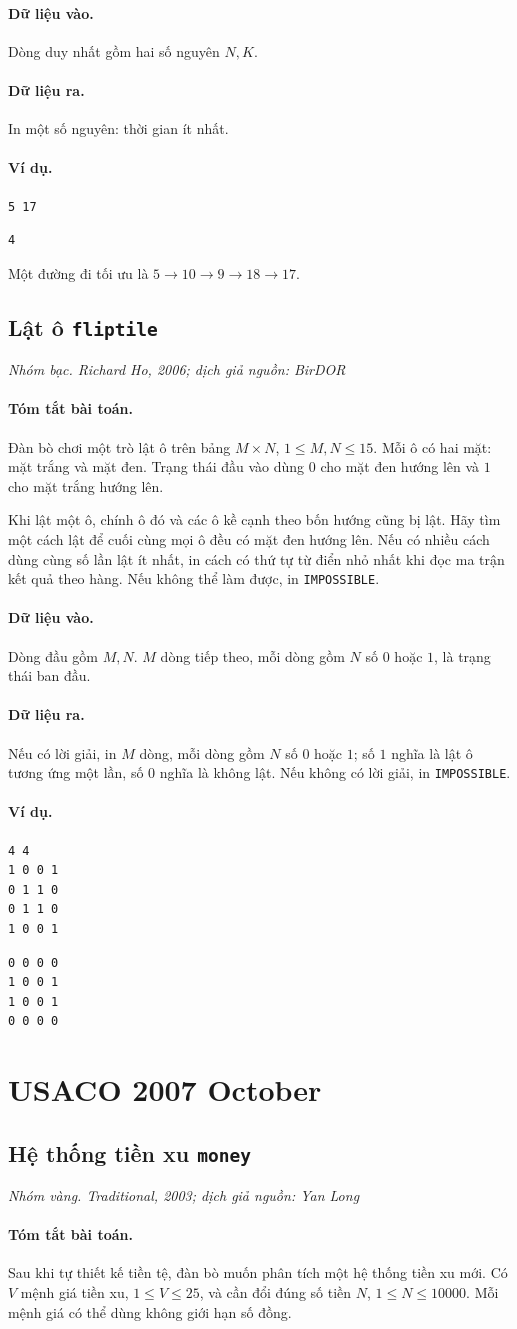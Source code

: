 \documentclass[11pt]{article}
\newcommand{\problem}[4]{%
  \subsection[#1 (#2)]{#1 \hfill {\normalsize\texttt{#2}}}%
  \noindent\textit{#3. #4}\par\smallskip
}
\newcommand{\iosec}[1]{\paragraph{#1}}
\begin{document}
\iosec{Dữ liệu vào.}
Dòng duy nhất gồm hai số nguyên \(N,K\).

\iosec{Dữ liệu ra.}
In một số nguyên: thời gian ít nhất.

\iosec{Ví dụ.}
\begin{verbatim}
5 17
\end{verbatim}

\begin{verbatim}
4
\end{verbatim}

Một đường đi tối ưu là \(5\to10\to9\to18\to17\).

\problem{Lật ô}{fliptile}{Nhóm bạc}{Richard Ho, 2006; dịch giả nguồn: BirDOR}

\iosec{Tóm tắt bài toán.}
Đàn bò chơi một trò lật ô trên bảng \(M\times N\),
\(1\le M,N\le 15\). Mỗi ô có hai mặt: mặt trắng và mặt đen. Trạng thái đầu
vào dùng \(0\) cho mặt đen hướng lên và \(1\) cho mặt trắng hướng lên.

Khi lật một ô, chính ô đó và các ô kề cạnh theo bốn hướng cũng bị lật. Hãy
tìm một cách lật để cuối cùng mọi ô đều có mặt đen hướng lên. Nếu có nhiều
cách dùng cùng số lần lật ít nhất, in cách có thứ tự từ điển nhỏ nhất khi đọc
ma trận kết quả theo hàng. Nếu không thể làm được, in \texttt{IMPOSSIBLE}.

\iosec{Dữ liệu vào.}
Dòng đầu gồm \(M,N\). \(M\) dòng tiếp theo, mỗi dòng gồm \(N\) số \(0\) hoặc
\(1\), là trạng thái ban đầu.

\iosec{Dữ liệu ra.}
Nếu có lời giải, in \(M\) dòng, mỗi dòng gồm \(N\) số \(0\) hoặc \(1\); số
\(1\) nghĩa là lật ô tương ứng một lần, số \(0\) nghĩa là không lật. Nếu không
có lời giải, in \texttt{IMPOSSIBLE}.

\iosec{Ví dụ.}
\begin{verbatim}
4 4
1 0 0 1
0 1 1 0
0 1 1 0
1 0 0 1
\end{verbatim}

\begin{verbatim}
0 0 0 0
1 0 0 1
1 0 0 1
0 0 0 0
\end{verbatim}

\section{USACO 2007 October}

\problem{Hệ thống tiền xu}{money}{Nhóm vàng}{Traditional, 2003; dịch giả nguồn: Yan Long}

\iosec{Tóm tắt bài toán.}
Sau khi tự thiết kế tiền tệ, đàn bò muốn phân tích một hệ thống tiền xu mới.
Có \(V\) mệnh giá tiền xu, \(1\le V\le 25\), và cần đổi đúng số tiền \(N\),
\(1\le N\le 10000\). Mỗi mệnh giá có thể dùng không giới hạn số đồng.
\end{document}
